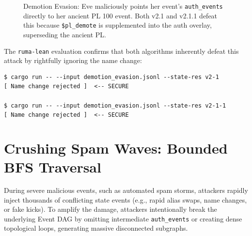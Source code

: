 \documentclass[12pt]{article}
\begin{document}
\begin{figure}[H]
\centering
{}
\caption{Demotion Evasion: Eve maliciously points her event's \texttt{auth\_events} directly to her ancient PL 100 event. Both v2.1 and v2.1.1 defeat this because \texttt{\$pl\_demote} is supplemented into the auth overlay, superseding the ancient PL.}
\label{fig:demotion_evasion}
\end{figure}

The \texttt{ruma-lean} evaluation confirms that both algorithms inherently defeat this attack by rightfully ignoring the name change:
\begin{lstlisting}[basicstyle=\ttfamily\footnotesize, frame=single, caption={ruma-lean Validation: Demotion Evasion}]
$ cargo run -- --input demotion_evasion.jsonl --state-res v2-1
[ Name change rejected ]  <-- SECURE

$ cargo run -- --input demotion_evasion.jsonl --state-res v2-1-1
[ Name change rejected ]  <-- SECURE
\end{lstlisting}

\section{Crushing Spam Waves: Bounded BFS Traversal}
During severe malicious events, such as automated spam storms, attackers rapidly inject thousands of conflicting state events (e.g., rapid alias swaps, name changes, or fake kicks). To amplify the damage, attackers intentionally break the underlying Event DAG by omitting intermediate \texttt{auth\_events} or creating dense topological loops, generating massive disconnected subgraphs.
\end{document}
